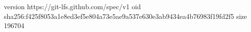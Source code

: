 version https://git-lfs.github.com/spec/v1
oid sha256:f425f8053a1e8ed3ef5e804a73e5ae9a537e630e3ab9434ea4b76983f19fd2f5
size 196704

